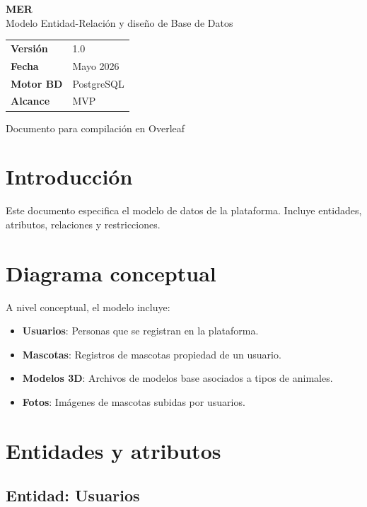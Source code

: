 \documentclass[12pt,a4paper]{article}
\author{Equipo del Proyecto}
\date{Mayo 2026}
\begin{document}
\begin{titlepage}
\centering
\vspace*{1.8cm}
{\Huge\bfseries\color{PrimaryBlue} MER\\[0.35em]}
{\LARGE Modelo Entidad-Relaci\'on y dise\~no de Base de Datos\\[1.2cm]}

\begin{tabular}{p{5cm} p{8cm}}
\rowcolor{SoftGray}
\textbf{Versi\'on} & 1.0 \\
\textbf{Fecha} & Mayo 2026 \\
\textbf{Motor BD} & PostgreSQL \\
\textbf{Alcance} & MVP \\
\end{tabular}

\vfill
{\large Documento para compilaci\'on en Overleaf}
\end{titlepage}

\tableofcontents
\newpage

\section{Introducci\'on}
Este documento especifica el modelo de datos de la plataforma. Incluye entidades, atributos, relaciones y restricciones.

\section{Diagrama conceptual}

A nivel conceptual, el modelo incluye:
\begin{itemize}[leftmargin=*]
    \item \textbf{Usuarios}: Personas que se registran en la plataforma.
    \item \textbf{Mascotas}: Registros de mascotas propiedad de un usuario.
    \item \textbf{Modelos 3D}: Archivos de modelos base asociados a tipos de animales.
    \item \textbf{Fotos}: Im\'agenes de mascotas subidas por usuarios.
\end{itemize}

\section{Entidades y atributos}

\subsection{Entidad: Usuarios}
\end{document}
